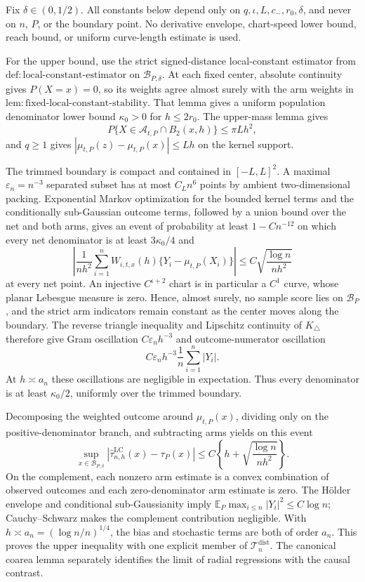 Fix \(\delta\in(0,1/2)\).  All constants below depend only on \(q,\iota,L,c_-,r_0,\delta\), and never on \(n\), \(P\), or the boundary point.  No derivative envelope, chart-speed lower bound, reach bound, or uniform curve-length estimate is used.

For the upper bound, use the strict signed-distance local-constant estimator from \(\mathrm{def:local\text{-}constant\text{-}estimator}\) on \(\mathcal B_{P,\delta}\).  At each fixed center, absolute continuity gives \(P(X=x)=0\), so its weights agree almost surely with the arm weights in \(\mathrm{lem:fixed\text{-}local\text{-}constant\text{-}stability}\).  That lemma gives a uniform population denominator lower bound \(\kappa_0>0\) for \(h\leq2r_0\).  The upper-mass lemma gives
\[
P\{X\in\mathcal A_{t,P}\cap B_2(x,h)\}\leq\pi Lh^2,
\]
and \(q\geq1\) gives \(|\mu_{t,P}(z)-\mu_{t,P}(x)|\leq Lh\) on the kernel support.

The trimmed boundary is compact and contained in \([-L,L]^2\).  A maximal \(\varepsilon_n=n^{-3}\) separated subset has at most \(C_Ln^6\) points by ambient two-dimensional packing.  Exponential Markov optimization for the bounded kernel terms and the conditionally sub-Gaussian outcome terms, followed by a union bound over the net and both arms, gives an event of probability at least \(1-Cn^{-12}\) on which every net denominator is at least \(3\kappa_0/4\) and
\[
\left|\frac1{nh^2}\sum_{i=1}^nW_{i,t,x}(h)
\{Y_i-\mu_{t,P}(X_i)\}\right|
\leq C\sqrt{\frac{\log n}{nh^2}}
\]
at every net point.  An injective \(C^{\iota+2}\) chart is in particular a \(C^1\) curve, whose planar Lebesgue measure is zero.  Hence, almost surely, no sample score lies on \(\mathcal B_P\), and the strict arm indicators remain constant as the center moves along the boundary.  The reverse triangle inequality and Lipschitz continuity of \(K_\triangle\) therefore give Gram oscillation \(C\varepsilon_nh^{-3}\) and outcome-numerator oscillation
\[
C\varepsilon_nh^{-3}\frac1n\sum_{i=1}^n|Y_i|.
\]
At \(h\asymp a_n\) these oscillations are negligible in expectation.  Thus every denominator is at least \(\kappa_0/2\), uniformly over the trimmed boundary.

Decomposing the weighted outcome around \(\mu_{t,P}(x)\), dividing only on the positive-denominator branch, and subtracting arms yields on this event
\[
\sup_{x\in\mathcal B_{P,\delta}}
|\widehat\tau^{\mathrm{LC}}_{n,h}(x)-\tau_P(x)|
\leq C\left\{h+\sqrt{\frac{\log n}{nh^2}}\right\}.
\]
On the complement, each nonzero arm estimate is a convex combination of observed outcomes and each zero-denominator arm estimate is zero.  The H\"older envelope and conditional sub-Gaussianity imply \(\mathbb E_P\max_{i\leq n}|Y_i|^2\leq C\log n\); Cauchy--Schwarz makes the complement contribution negligible.  With \(h\asymp a_n=(\log n/n)^{1/4}\), the bias and stochastic terms are both of order \(a_n\).  This proves the upper inequality with one explicit member of \(\mathcal T_n^{\mathrm{dist}}\).  The canonical coarea lemma separately identifies the limit of radial regressions with the causal contrast.


